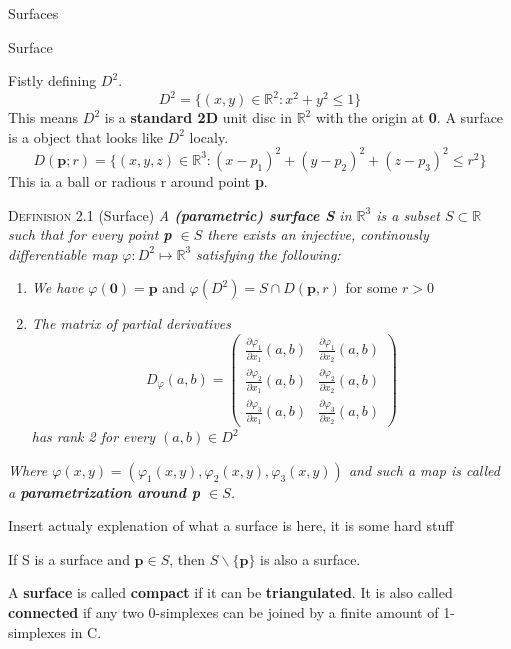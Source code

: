 \documentclass[12pt, letterpaper]{article}
\begin{document}
\begin{section}{Surfaces}

  \begin{subsection}{Surface}

    Fistly defining \(D^{2}\). \[D^{2} = \{ (x, y) \in \mathbb{R}^{2} : x^{2} + y^{2} \leq 1 \}\]
    This means \(D^{2}\) is a \textbf{standard 2D} unit disc in \(\mathbb{R}^{2}\)
    with the origin at \textbf{0}. A surface is a object that looks like \(D^{2}\)
    localy. \[D(\textbf{p}; r) = \{ (x, y, z) \in \mathbb{R}^{3} :
      (x - p_{1})^{2} + (y - p_{2})^{2} + (z - p_{3})^{2} \leq r^{2} \}\]
    This ia a ball or radious r around point \textbf{p}.

    \textsc{Definision 2.1} (Surface) \textit{A \textbf{(parametric) surface S} in \(\mathbb{R}^{3}\) is a subset \(S \subset \mathbb{R}\)
      such that for every point \textbf{p} \(\in S\) there exists an injective, continously differentiable map \(\varphi: D^{2} \mapsto \mathbb{R}^{3}\)
      satisfying the following:}
    \begin{enumerate}
      \item \textit{We have \(\varphi(\textbf{0}) = \textbf{p}\)} and \(\varphi(D^{2}) = S \cap D(\textbf{p}, r)\) for some \(r > 0\)
      \item \textit{The matrix of partial derivatives}
            \textit{\[ D_{\varphi}(a, b) = \begin{pmatrix}
              \frac{\partial \varphi_{1}}{\partial x_{1}}(a, b) & \frac{\partial \varphi_{1}}{\partial x_{2}}(a, b) \\
              \frac{\partial \varphi_{2}}{\partial x_{1}}(a, b) & \frac{\partial \varphi_{2}}{\partial x_{2}}(a, b) \\
              \frac{\partial \varphi_{3}}{\partial x_{1}}(a, b) & \frac{\partial \varphi_{3}}{\partial x_{2}}(a, b)
            \end{pmatrix}\]}
            \textit{has rank 2 for every \((a, b) \in D^{2}\)}
    \end{enumerate}
    \textit{Where \(\varphi(x, y) = (\varphi_{1}(x, y), \varphi_{2}(x, y), \varphi_{3}(x, y))\) and such a map is called a
    \textbf{parametrization around p} \(\in S\).}

    Insert actualy explenation of what a surface is here, it is some hard stuff

    If S is a surface and \(\textbf{p} \in S\), then \(S \backslash{} \{{} \textbf{p} \}{}\) is also a surface.

    A \textbf{surface} is called \textbf{compact} if it can be \textbf{triangulated}.
    It is also called \textbf{connected} if any two 0-simplexes can be joined by
    a finite amount of 1-simplexes in C.


\end{subsection}
\end{section}
\end{document}
